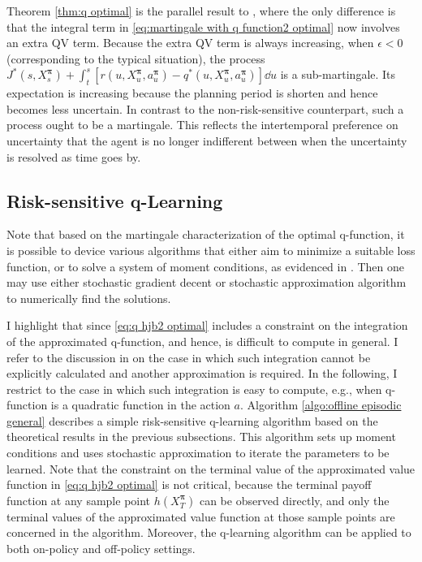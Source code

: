Theorem \ref{thm:q optimal} is the parallel result to \citet[Theorem 9]{jia2022q}, where the only difference is that the integral term in \eqref{eq:martingale with q function2 optimal} now involves an extra QV term. Because the extra QV term is always increasing, when $\epsilon < 0$ (corresponding to the typical situation), the process ${J^*}(s,{X}_s^{\bm\pi}) + \int_t^s \left[ r(u,{X}_{u}^{\bm\pi},a^{\bm\pi}_{u}) - {q^*}(u,{X}_{u}^{\bm\pi},a^{\bm\pi}_{u})  \right]\dd u$ is a sub-martingale. Its expectation is increasing because the planning period is shorten and hence becomes less uncertain. In contrast to the non-risk-sensitive counterpart, such a process ought to be a martingale. This reflects the intertemporal preference on uncertainty that the agent is no longer indifferent between when the uncertainty is resolved as time goes by.  


\subsection{Risk-sensitive q-Learning}
Note that based on the martingale characterization of the optimal q-function, it is possible to device various algorithms that either aim to minimize a suitable loss function, or to solve a system of moment conditions, as evidenced in \cite{jia2022q}. Then one may use either stochastic gradient decent or stochastic approximation algorithm to numerically find the solutions. 

I highlight that since \eqref{eq:q hjb2 optimal} includes a constraint on the integration of the approximated q-function, and hence, is difficult to compute in general. I refer to the discussion in \cite{jia2022q} on the case in which such integration cannot be explicitly calculated and another approximation is required. In the following, I restrict to the case in which such integration is easy to compute, e.g., when q-function is a quadratic function in the action $a$. Algorithm \ref{algo:offline episodic general} describes a simple risk-sensitive q-learning algorithm based on the theoretical results in the previous subsections. This algorithm sets up moment conditions and uses stochastic approximation to iterate the parameters to be learned. Note that the constraint on the terminal value of the approximated value function in \eqref{eq:q hjb2 optimal} is not critical, because the terminal payoff function at any sample point $h(X_T^{\bm\pi})$ can be observed directly, and only the terminal values of the approximated value function at those sample points are concerned in the algorithm. Moreover, the q-learning algorithm can be applied to both on-policy and off-policy settings. 

